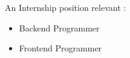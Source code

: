 An Internship position relevant :
\begin{itemize}
    \item Backend Programmer
    \item Frontend Programmer
\end{itemize}
